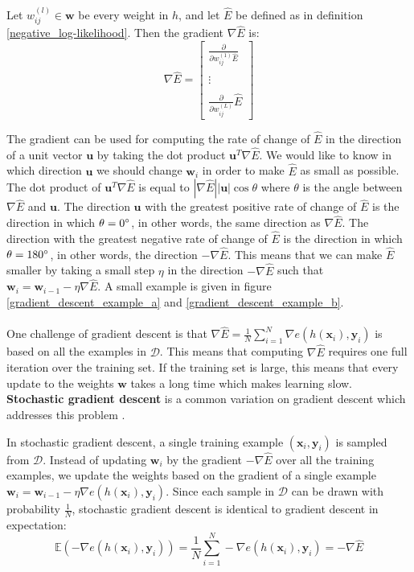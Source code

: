 \begin{definition}[gradient]
	\label{gradient}
	Let $w^{(l)}_{ij} \in \mathbf{w}$ be every weight in $h$, and let $\hat{E}$ be defined as in definition \ref{negative_log-likelihood}. Then the gradient $\nabla \hat{E}$ is:
	$$
	\nabla \hat{E} = \begin{bmatrix} \frac{\partial}{\partial w^{(1)}_{ij}\hat{E}} \\ \\ \vdots \\ \\ \frac{\partial}{\partial w^{(L)}_{ij}}\hat{E}\end{bmatrix}
	$$
\end{definition}
\noindent
The gradient can be used for computing the rate of change of $\hat{E}$ in the direction of a unit vector $\mathbf{u}$ by taking the dot product $\mathbf{u}^T\nabla \hat{E}$. We would like to know in which direction $\mathbf{u}$ we should change $\mathbf{w}_i$ in order to make $\hat{E}$ as small as possible. The dot product of $\mathbf{u}^T\nabla \hat{E}$ is equal to $|\nabla \hat{E}||\mathbf{u}|\cos \theta$ where $\theta$ is the angle between $\nabla \hat{E}$ and $\mathbf{u}$. The direction $\mathbf{u}$ with the greatest positive rate of change of $\hat{E}$ is the direction in which $\theta = 0\degree$, in other words, the same direction as $\nabla \hat{E}$. The direction with the greatest negative rate of change of $\hat{E}$ is the direction in which $\theta = 180\degree$, in other words, the direction $-\nabla \hat{E}$. This means that we can make $\hat{E}$ smaller by taking a small step $\eta$ in the direction $-\nabla \hat{E}$ such that $\mathbf{w}_i = \mathbf{w}_{i-1} - \eta\nabla\hat{E}$. A small example is given in figure \ref{gradient_descent_example_a} and \ref{gradient_descent_example_b}.
\\\\
One challenge of gradient descent is that $\nabla \hat{E} = \frac{1}{N}\sum_{i=1}^N\nabla e(h(\mathbf{x}_i), \mathbf{y}_i)$ is based on all the examples in $\mathcal{D}$. This means that computing $\nabla \hat{E}$ requires one full iteration over the training set. If the training set is large, this means that every update to the weights $\mathbf{w}$ takes a long time which makes learning slow. \textbf{Stochastic gradient descent} is a common variation on gradient descent which addresses this problem \citep{yaser12}. 

In stochastic gradient descent, a single training example $(\mathbf{x}_i, \mathbf{y}_i)$ is sampled from $\mathcal{D}$. Instead of updating $\mathbf{w}_i$ by the gradient $-\nabla \hat{E}$ over all the training examples, we update the weights based on the gradient of a single example $\mathbf{w}_i = \mathbf{w}_{i-1}-\eta\nabla e(h(\mathbf{x}_i), \mathbf{y}_i)$. Since each sample in $\mathcal{D}$ can be drawn with probability $\frac{1}{N}$, stochastic gradient descent is identical to gradient descent in expectation:
$$
\mathbb{E}(-\nabla e(h(\mathbf{x}_i), \mathbf{y}_i)) = \frac{1}{N}\sum\limits_{i=1}^N -\nabla e(h(\mathbf{x}_i), \mathbf{y}_i) = -\nabla\hat{E}
$$

